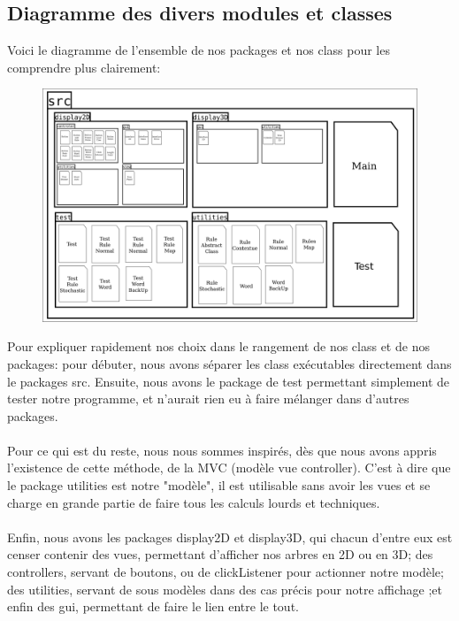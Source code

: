 \documentclass[a4paper,12pt]{article}
\begin{document}
\subsection{Diagramme des divers modules et classes}

 Voici le diagramme de l'ensemble de nos packages et nos class pour les comprendre plus clairement:

\begin{figure}[h]
\centering
\includegraphics[scale=0.155]{Diagram_packages}
\end{figure}

Pour expliquer rapidement nos choix dans le rangement de nos class et de nos packages: pour débuter, nous avons séparer les class exécutables directement dans le packages src. Ensuite, nous avons le package de test permettant simplement de tester notre programme, et n'aurait rien eu à faire mélanger dans d'autres packages.
\\\\
Pour ce qui est du reste, nous nous sommes inspirés, dès que nous avons appris l'existence de cette méthode, de la MVC (modèle vue controller). C'est à dire que le package utilities est notre "modèle", il est utilisable sans avoir les vues et se charge en grande partie de faire tous les calculs lourds et techniques. 
\\\\
Enfin, nous avons les packages display2D et display3D, qui chacun d'entre eux est censer contenir des vues, permettant d'afficher nos arbres en 2D ou en 3D; des controllers, servant de boutons, ou de clickListener pour actionner notre modèle; des utilities, servant de sous modèles dans des cas précis pour notre affichage ;et enfin des gui, permettant de faire le lien entre le tout.
\end{document}
